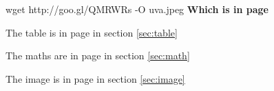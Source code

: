 \documentclass[12pt]{report}
\begin{document}
\begin{thebibliography}{9}
wget http://goo.gl/QMRWRs -O uva.jpeg \textbf{Which is in page } \pageref{sec:uva}

The table is in page \pageref{sec:table} in section \ref{sec:table}

The maths are in page \pageref{sec:math} in section \ref{sec:math}

The image is in page \pageref{sec:image} in section \ref{sec:image}
\end{thebibliography}
\end{document}
